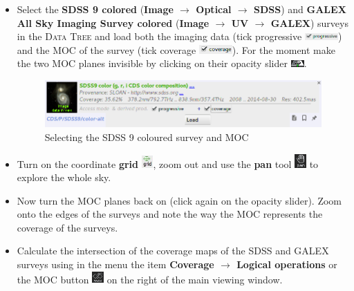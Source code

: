 \documentclass [a4paper, 12pt]{article}
\begin{document}
\begin{itemize}
    \item Select the \textbf{SDSS 9 colored} (\textbf{Image $\rightarrow$ 
Optical $\rightarrow$ SDSS}) and \textbf{GALEX All Sky Imaging Survey 
colored} (\textbf{Image $\rightarrow$ UV $\rightarrow$ GALEX}) surveys in the 
\textsc{Data Tree} and load both the imaging data (tick progressive 
\includegraphics[width=0.1\textwidth]{../images/aladin_load_progessive.png}) 
and the MOC of the survey (tick coverage
\includegraphics[width=0.1\textwidth]{../images/aladin_load_coverage.png}). For 
the moment make the two MOC planes invisible by clicking on their opacity slider
\includegraphics[width=0.04\textwidth]{../images/aladin_button_opacity.png}.
\begin{figure}[H]
\center
\includegraphics[width=0.7  
\textwidth]{../images/aladin_load_sdss-image-moc.png}
\caption{Selecting the SDSS 9 coloured survey and MOC}
\label{fig:aladinselect}
\end{figure}

    \item Turn on the coordinate \textbf{grid} 
\includegraphics[width=0.035\textwidth]{../images/aladin_button_grid.jpg}, zoom 
out and use 
the \textbf{pan} tool 
\includegraphics[width=0.035\textwidth]{../images/aladin_button_pan.png} to 
explore the whole sky.

    \item Now turn the MOC planes back on (click again on the opacity slider).
Zoom onto the edges of the surveys and note the way the MOC represents the 
coverage of the surveys.

    \item Calculate the intersection of the coverage maps of the SDSS and 
GALEX surveys using in the menu the item \textbf{Coverage $\rightarrow$ 
Logical operations} or the MOC button 
\includegraphics[width=0.035\textwidth]{../images/aladin_button_moc.png} on the 
right of the main viewing window. 


\end{itemize}
\end{document}
